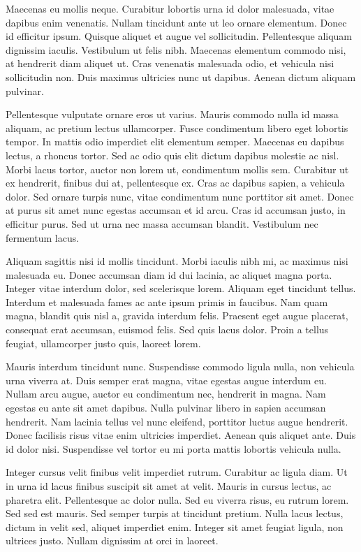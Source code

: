 \documentclass{homework}
\begin{document}
Maecenas eu mollis neque. Curabitur lobortis urna id dolor malesuada, vitae dapibus enim venenatis. Nullam tincidunt ante ut leo ornare elementum. Donec id efficitur ipsum. Quisque aliquet et augue vel sollicitudin. Pellentesque aliquam dignissim iaculis. Vestibulum ut felis nibh. Maecenas elementum commodo nisi, at hendrerit diam aliquet ut. Cras venenatis malesuada odio, et vehicula nisi sollicitudin non. Duis maximus ultricies nunc ut dapibus. Aenean dictum aliquam pulvinar.

Pellentesque vulputate ornare eros ut varius. Mauris commodo nulla id massa aliquam, ac pretium lectus ullamcorper. Fusce condimentum libero eget lobortis tempor. In mattis odio imperdiet elit elementum semper. Maecenas eu dapibus lectus, a rhoncus tortor. Sed ac odio quis elit dictum dapibus molestie ac nisl. Morbi lacus tortor, auctor non lorem ut, condimentum mollis sem. Curabitur ut ex hendrerit, finibus dui at, pellentesque ex. Cras ac dapibus sapien, a vehicula dolor. Sed ornare turpis nunc, vitae condimentum nunc porttitor sit amet. Donec at purus sit amet nunc egestas accumsan et id arcu. Cras id accumsan justo, in efficitur purus. Sed ut urna nec massa accumsan blandit. Vestibulum nec fermentum lacus.

Aliquam sagittis nisi id mollis tincidunt. Morbi iaculis nibh mi, ac maximus nisi malesuada eu. Donec accumsan diam id dui lacinia, ac aliquet magna porta. Integer vitae interdum dolor, sed scelerisque lorem. Aliquam eget tincidunt tellus. Interdum et malesuada fames ac ante ipsum primis in faucibus. Nam quam magna, blandit quis nisl a, gravida interdum felis. Praesent eget augue placerat, consequat erat accumsan, euismod felis. Sed quis lacus dolor. Proin a tellus feugiat, ullamcorper justo quis, laoreet lorem.

Mauris interdum tincidunt nunc. Suspendisse commodo ligula nulla, non vehicula urna viverra at. Duis semper erat magna, vitae egestas augue interdum eu. Nullam arcu augue, auctor eu condimentum nec, hendrerit in magna. Nam egestas eu ante sit amet dapibus. Nulla pulvinar libero in sapien accumsan hendrerit. Nam lacinia tellus vel nunc eleifend, porttitor luctus augue hendrerit. Donec facilisis risus vitae enim ultricies imperdiet. Aenean quis aliquet ante. Duis id dolor nisi. Suspendisse vel tortor eu mi porta mattis lobortis vehicula nulla.

Integer cursus velit finibus velit imperdiet rutrum. Curabitur ac ligula diam. Ut in urna id lacus finibus suscipit sit amet at velit. Mauris in cursus lectus, ac pharetra elit. Pellentesque ac dolor nulla. Sed eu viverra risus, eu rutrum lorem. Sed sed est mauris. Sed semper turpis at tincidunt pretium. Nulla lacus lectus, dictum in velit sed, aliquet imperdiet enim. Integer sit amet feugiat ligula, non ultrices justo. Nullam dignissim at orci in laoreet.
\end{document}
